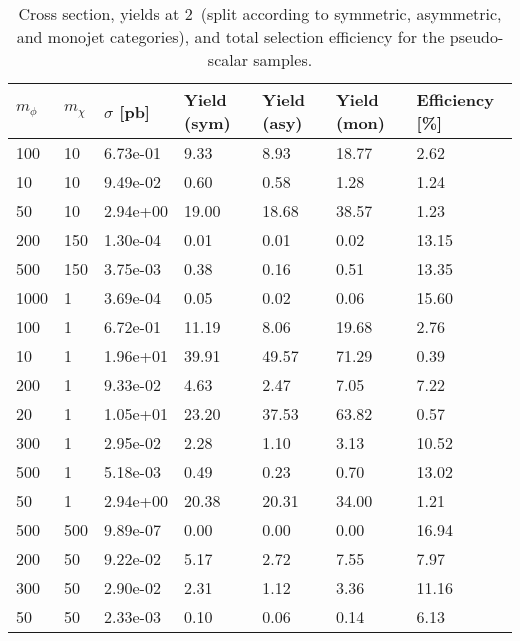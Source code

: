 \begin{table}
\small
\centering
\begin{tabular}{lllllll}
\hline
$m_\phi$ & $m_\chi$ & $\sigma$ [pb] & Yield (sym) & Yield (asy) & Yield (mon) & Efficiency [\%] \\ \hline
100       &   10        &   6.73e-01  &   9.33      &   8.93      &   18.77     &   2.62      \\ 
10        &   10        &   9.49e-02  &   0.60      &   0.58      &   1.28      &   1.24      \\ 
50        &   10        &   2.94e+00  &   19.00     &   18.68     &   38.57     &   1.23      \\ 
200       &   150       &   1.30e-04  &   0.01      &   0.01      &   0.02      &   13.15     \\ 
500       &   150       &   3.75e-03  &   0.38      &   0.16      &   0.51      &   13.35     \\ 
1000      &   1         &   3.69e-04  &   0.05      &   0.02      &   0.06      &   15.60     \\ 
100       &   1         &   6.72e-01  &   11.19     &   8.06      &   19.68     &   2.76      \\ 
10        &   1         &   1.96e+01  &   39.91     &   49.57     &   71.29     &   0.39      \\ 
200       &   1         &   9.33e-02  &   4.63      &   2.47      &   7.05      &   7.22      \\ 
20        &   1         &   1.05e+01  &   23.20     &   37.53     &   63.82     &   0.57      \\ 
300       &   1         &   2.95e-02  &   2.28      &   1.10      &   3.13      &   10.52     \\ 
500       &   1         &   5.18e-03  &   0.49      &   0.23      &   0.70      &   13.02     \\ 
50        &   1         &   2.94e+00  &   20.38     &   20.31     &   34.00     &   1.21      \\ 
500       &   500       &   9.89e-07  &   0.00      &   0.00      &   0.00      &   16.94     \\ 
200       &   50        &   9.22e-02  &   5.17      &   2.72      &   7.55      &   7.97      \\ 
300       &   50        &   2.90e-02  &   2.31      &   1.12      &   3.36      &   11.16     \\ 
50        &   50        &   2.33e-03  &   0.10      &   0.06      &   0.14      &   6.13      \\ 
\hline
\end{tabular}
\caption{Cross section, yields at 2~\ifb (split according to symmetric, asymmetric, and monojet categories), and total selection efficiency for the pseudo-scalar \DMtt samples.}
\label{tab:dm_DMttP_g1_2fb}
\end{table}
